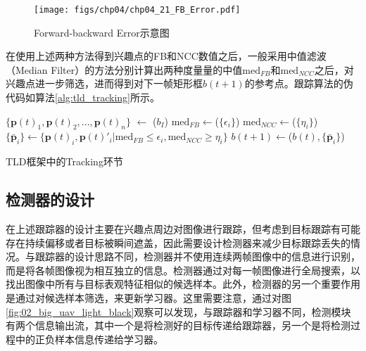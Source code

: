 \begin{figure}[ht]   
	\centering
	\texttt{[image: figs/chp04/chp04\_21\_FB\_Error.pdf]}
	\caption{Forward-backward Error示意图}
	\label{fig:chp04_21_FB_Error}
\end{figure}

在使用上述两种方法得到兴趣点的FB和NCC数值之后，一般采用中值滤波（Median Filter）的方法分别计算出两种度量量的中值$\text{med}_{FB}$和$\text{med}_{NCC}$之后，对兴趣点进一步筛选，进而得到对下一帧矩形框$b(t+1)$的参考点。跟踪算法的伪代码如算法\ref{alg:tld_tracking}所示。

\begin{algorithm2e}[ht]
	\SetAlgoLined
	\BlankLine
	$\{\mathbf{p}(t)_1, \mathbf{p}(t)_2,...,\mathbf{p}(t)_n\}$ $\leftarrow$ \Initialization($b_I$)\;	
	$\text{med}_{FB} \leftarrow$\MedianFlow($\{\epsilon_i\}$) \;
	$\text{med}_{NCC} \leftarrow$\MedianFlow($\{\eta_i\}$) \;
	$\{\bar{\mathbf{p}}_i\} \leftarrow  \{\mathbf{p}(t)_i,\mathbf{p}(t)'_i|\text{med}_{FB} \le \epsilon_i, \text{med}_{NCC} \ge \eta_i \}$\;
	$b(t+1) \leftarrow$\Transform($b(t),\{\bar{\mathbf{p}}_i\}$)\;
	\caption{TLD框架中的Tracking环节}
	\label{alg:tld_tracking}
\end{algorithm2e}



\subsection{检测器的设计}
在上述跟踪器的设计主要在兴趣点周边对图像进行跟踪，但考虑到目标跟踪有可能存在持续偏移或者目标被瞬间遮盖，因此需要设计检测器来减少目标跟踪丢失的情况。与跟踪器的设计思路不同，检测器并不使用连续两帧图像中的信息进行识别，而是将各帧图像视为相互独立的信息。检测器通过对每一帧图像进行全局搜索，以找出图像中所有与目标表观特征相似的候选样本。此外，检测器的另一个重要作用是通过对候选样本筛选，来更新学习器。这里需要注意，通过对图\ref{fig:02_big_uav_light_black}观察可以发现，与跟踪器和学习器不同，检测模块有两个信息输出流，其中一个是将检测好的目标传递给跟踪器，另一个是将检测过程中的正负样本信息传递给学习器。

